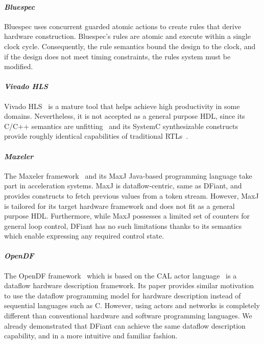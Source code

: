 \paragraph*{\bf \em Bluespec} 
Bluespec uses concurrent guarded atomic actions to create rules that derive hardware construction. Bluespec's rules are atomic and execute within a single clock cycle. Consequently, the rule semantics bound the design to the clock, and if the design does not meet timing constraints, the rules system must be modified.

\paragraph*{\bf \em Vivado HLS} 
Vivado HLS~\cite{Vivado2012} is a mature tool that helps achieve high productivity in some domains. Nevertheless, it is not accepted as a general purpose HDL, since its C/C++ semantics are unfitting~\cite{Zhao2017} and its SystemC synthesizable constructs provide roughly identical capabilities of traditional RTLs~\cite{gajski2010input}.

\paragraph*{\bf \em Maxeler} 
The Maxeler framework~\cite{Pell2011} and its MaxJ Java-based programming language take part in acceleration systems. MaxJ is dataflow-centric, same as DFiant, and provides constructs to fetch previous values from a token stream. However, MaxJ is tailored for its target hardware framework and does not fit as a general purpose HDL. Furthermore, while MaxJ possesses a limited set of counters for general loop control, DFiant has no such limitations thanks to its  semantics which enable expressing any required control state.

\paragraph*{\bf \em OpenDF} 
The OpenDF framework~\cite{bhattacharyya2008opendf} which is based on the CAL actor language~\cite{eker2003cal} is a dataflow hardware description framework. Its paper provides similar motivation to use the dataflow programming model for hardware description instead of sequential languages such as C. However, using actors and networks is completely different than conventional hardware and software programming languages. We already demonstrated that DFiant can achieve the same dataflow description capability, and in a more intuitive and familiar fashion.
